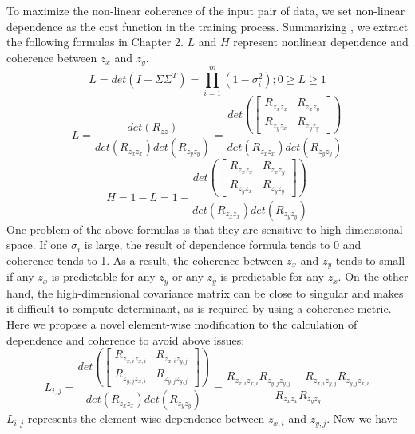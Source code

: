 \documentclass[12pt]{report} %
\begin{document}
To maximize the non-linear coherence of the input pair of data, we set non-linear dependence as the cost function in the training process. Summarizing \cite{ECCA}, we extract the following formulas in Chapter 2. $L$ and $H$ represent nonlinear dependence and coherence between $z_x$ and $z_y$.
\begin{equation}
L=det(I-\Sigma\Sigma^T)=\prod_{i=1}^{m}(1-\sigma_i^2);0 \geq L \geq 1
\end{equation}
\begin{equation}
L=\frac{det(R_{zz})}
{det(R_{z_{x}z_{x}})det(R_{z_{y}z_{y}})}=\frac{det\left(\begin{bmatrix}
	R_{z_{x}z_{x}} & R_{z_{x}z_{y}} \\
	R_{z_{y}z_{x}} & R_{z_{y}z_{y}}
	\end{bmatrix}\right)}
{det(R_{z_{x}z_{x}})det(R_{z_{y}z_{y}})}
\end{equation}
\begin{equation}
H=1-L=1-\frac{det\left(\begin{bmatrix}
	R_{z_{x}z_{x}} & R_{z_{x}z_{y}} \\
	R_{z_{y}z_{x}} & R_{z_{y}z_{y}}
	\end{bmatrix}\right)}
{det(R_{z_{x}z_{x}})det(R_{z_{y}z_{y}})}
\end{equation}
One problem of the above formulas is that they are sensitive to high-dimensional space. If one \(\sigma_i\) is large, the result of dependence formula tends to 0 and coherence tends to 1. As a result, the coherence between $z_x$ and $z_y$ tends to small if any $z_x$ is predictable for any $z_y$ or any $z_y$ is predictable for any $z_x$. On the other hand, the high-dimensional covariance matrix can be close to singular and makes it difficult to compute determinant, as is required by using a coherence metric. Here we propose a novel element-wise modification to the calculation of dependence and coherence to avoid above issues:
\begin{equation}
L_{i,j}=\frac{det\left(\begin{bmatrix}
	R_{z_{x,i}z_{x,i}} & R_{z_{x,i}z_{y,j}} \\
	R_{z_{y,j}z_{x,i}} & R_{z_{y,j}z_{y,j}}
	\end{bmatrix}\right)}
{det(R_{z_{x}z_{x}})det(R_{z_{y}z_{y}})}=
\frac{R_{z_{x,i}z_{x,i}}R_{z_{y,j}z_{y,j}}-R_{z_{x,i}z_{y,j}}R_{z_{y,j}z_{x,i}}}
{R_{z_{x}z_{x}}R_{z_{y}z_{y}}}
\end{equation}
\(L_{i,j}\) represents the element-wise dependence between $z_{x,i}$ and $z_{y,j}$. Now we have
\end{document}
